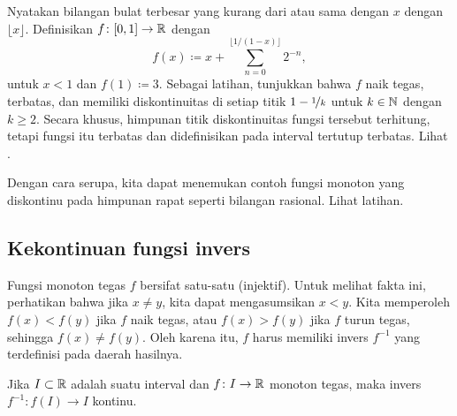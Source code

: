 \begin{example} \label{example:countdiscont}
Nyatakan bilangan bulat terbesar yang kurang dari atau sama dengan $x$
dengan $\lfloor x \rfloor$.
Definisikan $f \colon [0,1] \to {\mathbb{R}}$ dengan
\begin{equation*}
f(x) \coloneqq
x +
\sum_{n=0}^{\lfloor 1/(1-x) \rfloor}
2^{-n} ,
\end{equation*}
untuk $x < 1$ dan $f(1) \coloneqq 3$.
Sebagai latihan, tunjukkan bahwa $f$ naik tegas, terbatas, dan
memiliki diskontinuitas di setiap titik $1-\nicefrac{1}{k}$ untuk $k \in {\mathbb{N}}$ dengan $k \geq 2$.  Secara khusus,
himpunan titik diskontinuitas fungsi tersebut terhitung, tetapi fungsi itu terbatas dan
didefinisikan pada interval tertutup terbatas.  Lihat .
\begin{myfigureht}
\caption{Fungsi naik tegas pada $[0,1]$ dengan himpunan titik diskontinuitas
yang terhitung.\label{fig:countdiscont}}
\end{myfigureht}

Dengan cara serupa, kita dapat menemukan contoh fungsi monoton yang diskontinu pada himpunan rapat
seperti bilangan rasional.  Lihat latihan.
\end{example}


\subsection{Kekontinuan fungsi invers}


Fungsi monoton tegas $f$ bersifat satu-satu (injektif).
Untuk melihat fakta ini,
perhatikan bahwa jika $x \neq y$, kita dapat mengasumsikan $x < y$.  Kita memperoleh $f(x) <
f(y)$ jika $f$ naik tegas, atau $f(x) > f(y)$ jika $f$ turun
tegas, sehingga $f(x) \neq f(y)$.
Oleh karena itu, $f$ harus memiliki invers $f^{-1}$ yang terdefinisi pada daerah hasilnya.

\begin{prop} \label{prop:invcont}
Jika $I \subset {\mathbb{R}}$ adalah suatu interval dan $f \colon I \to {\mathbb{R}}$ monoton
tegas, maka invers $f^{-1} \colon f(I) \to I$ kontinu.
\end{prop}

